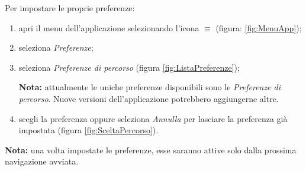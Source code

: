 \documentclass[../ClipsManualeUtente.tex]{subfiles}
\begin{document}
		Per impostare le proprie preferenze:
		\begin{enumerate}
			\item apri il menu dell'applicazione selezionando l'icona $\equiv$ (figura: \ref{fig:MenuApp});
			\item seleziona \textit{Preferenze};
			\item seleziona \textit{Preferenze di percorso} (figura \ref{fig:ListaPreferenze});
			
	\begin{framed}
	\textbf{Nota:} attualmente le uniche preferenze disponibili sono le \textit{Preferenze di percorso}. Nuove versioni dell'applicazione potrebbero aggiungerne altre.
	\end{framed}			
			
			\item scegli la preferenza oppure seleziona \textit{Annulla} per lasciare la preferenza già impostata (figura \ref{fig:SceltaPercorso}).
		\end{enumerate}

	\begin{framed} 
	\textbf{Nota:} una volta impostate le preferenze, esse saranno attive solo dalla prossima navigazione avviata.
	\end{framed}
	
\end{document}
